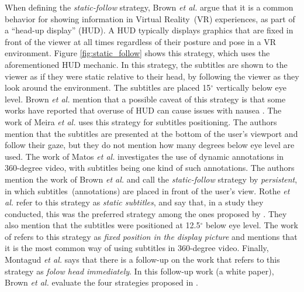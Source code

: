 When defining the \emph{static-follow} strategy, Brown \emph{et al.} \cite{brown_subtitles_2017} argue that it is a common behavior for showing information in Virtual Reality~(VR) experiences, as part of a ``head-up display'' (HUD). A HUD typically displays graphics that are fixed in front of the viewer at all times regardless of their posture and pose in a VR environment. Figure \ref{fig:static_follow} shows this strategy, which uses the aforementioned HUD mechanic. In this strategy, the subtitles are shown to the viewer as if they were static relative to their head, by following the viewer as they look around the environment. The subtitles are placed 15$^{\circ}$ vertically below eye level. Brown \emph{et al.} \cite{brown_subtitles_2017} mention that a possible caveat of this strategy is that some works have reported that overuse of HUD can cause issues with nausea \cite{laviola2000discussion, sharples2008virtual}.
The work of Meira \emph{et al.} \cite{meira_video_2016} uses this strategy for subtitles positioning. The authors mention that the subtitles are presented at the bottom of the user's viewport and follow their gaze, but they do not mention how many degrees below eye level are used. The work of Matos \emph{et al.} \cite{matos_dynamic_2018} investigates the use of dynamic annotations in 360-degree video, with subtitles being one kind of such annotations. The authors mention the work of Brown \emph{et al.} \cite{brown_subtitles_2017} and call the \emph{static-follow} strategy by \emph{persistent}, in which subtitles~(annotations) are placed in front of the user's view. Rothe \emph{et al.} \cite{rothe_dynamic_2018} refer to this strategy as \emph{static subtitles}, and say that, in a study they conducted, this was the preferred strategy among the ones proposed by \cite{brown_subtitles_2017}. They also mention that the subtitles were positioned at 12.5$^{\circ}$ below eye level. The work of \cite{hughes_disruptive_2019} refers to this strategy as \emph{fixed position in the display picture} and mentions that it is the most common way of using subtitles in 360-degree video. Finally, Montagud \emph{et al.} \cite{montagud_culture_2020} says that there is a follow-up on the work \cite{brown_subtitles_2017} that refers to this strategy as \emph{folow head immediately}. In this follow-up work (a white paper), Brown \emph{et al.} \cite{brown2018exploring} evaluate the four strategies proposed in \cite{brown_subtitles_2017}. 


